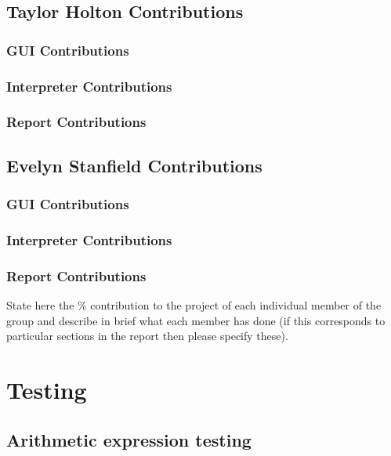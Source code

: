 \documentclass[a4paper, oneside, 11pt]{report}
\begin{document}
	\section{Taylor Holton Contributions}
	\subsection{GUI Contributions}
	\subsection{Interpreter Contributions}
	\subsection{Report Contributions}

	\section{Evelyn Stanfield Contributions}
	\subsection{GUI Contributions}
	\subsection{Interpreter Contributions}
	\subsection{Report Contributions}

	State here the \% contribution to the project of each individual member of the group and describe in brief what each member has done (if this corresponds to particular sections in the report then please specify these).

	\chapter{Testing}
	\label{app:test}
	\section{Arithmetic expression testing}
\end{document}
